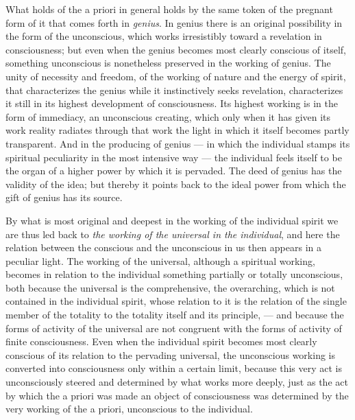 \documentclass[12pt,a4paper,openany]{book}
\newcommand{\opage}[1]{\marginnote{\footnotesize\textit{[#1]}}}
\begin{document}
What holds of the a priori in general holds by the same token of the
pregnant form of it that comes forth in \emph{genius}. In genius there
is an original possibility in the form of the unconscious, which works
irresistibly toward a revelation in consciousness; but even when the
genius becomes most clearly conscious of itself, something unconscious
is nonetheless preserved in the working of genius. The unity of
necessity and freedom, of the working of nature and the energy of
spirit, that characterizes the genius while it instinctively seeks
revelation, characterizes it still in its highest development of
consciousness. Its highest working is in the form of immediacy, an
unconscious creating,
\opage{54}which only when it has given its work reality radiates
through that work the light in which it itself becomes partly
transparent. And in the producing of genius --- in which the individual
stamps its spiritual peculiarity in the most intensive way --- the
individual feels itself to be the organ of a higher power by which it
is pervaded. The deed of genius has the validity of the idea; but
thereby it points back to the ideal power from which the gift of
genius has its source.

By what is most original and deepest in the working of the individual
spirit we are thus led back to \emph{the working of the universal in
the individual}, and here the relation between the conscious and the
unconscious in us then appears in a peculiar light. The working of the
universal, although a spiritual working, becomes in relation to the
individual something partially or totally unconscious, both because the
universal is the comprehensive, the overarching, which is not
contained in the individual spirit, whose relation to it is the
relation of the single member of the totality to the totality itself
and its principle, --- and because the forms of activity of the
universal are not congruent with the forms of activity of finite
consciousness. Even when the individual spirit becomes most clearly
conscious of its relation to the pervading universal, the unconscious
working is converted into consciousness only within a certain limit,
because this very act is unconsciously steered and determined by what
works more deeply, just as the act by which the a priori was made an
object of consciousness was determined by the very working of the a
priori, unconscious to the individual.
\end{document}
